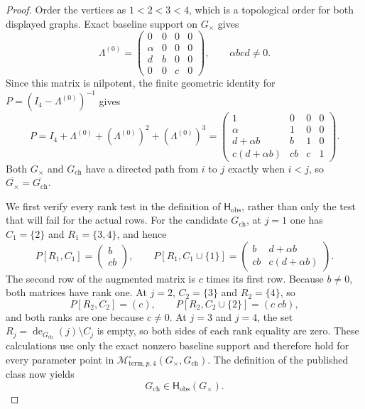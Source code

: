 \documentclass{article}
\begin{document}
\begin{proof}
Order the vertices as \(1<2<3<4\), which is a topological order for both displayed graphs.  Exact baseline support on \(G_{\times}\) gives
\[
\Lambda^{(0)}=
\begin{pmatrix}
0&0&0&0\\
\alpha&0&0&0\\
d&b&0&0\\
0&0&c&0
\end{pmatrix},
\qquad \alpha b c d\ne0.
\]
Since this matrix is nilpotent, the finite geometric identity for \(P=(I_4-\Lambda^{(0)})^{-1}\) gives
\[
P=I_4+\Lambda^{(0)}+(\Lambda^{(0)})^2+(\Lambda^{(0)})^3
=
\begin{pmatrix}
1&0&0&0\\
\alpha&1&0&0\\
d+\alpha b&b&1&0\\
c(d+\alpha b)&cb&c&1
\end{pmatrix}.
\]
Both \(G_{\times}\) and \(G_{\mathrm{ch}}\) have a directed path from \(i\) to \(j\) exactly when \(i<j\), so \(\overline{G_{\times}}=\overline{G_{\mathrm{ch}}}\).

We first verify every rank test in the definition of \(\mathsf H_{\mathrm{obs}}\), rather than only the test that will fail for the actual rows.  For the candidate \(G_{\mathrm{ch}}\), at \(j=1\) one has \(C_1=\{2\}\) and \(R_1=\{3,4\}\), and hence
\[
P[R_1,C_1]=\begin{pmatrix}b\\cb\end{pmatrix},
\qquad
P[R_1,C_1\cup\{1\}]
=\begin{pmatrix}
b&d+\alpha b\\
cb&c(d+\alpha b)
\end{pmatrix}.
\]
The second row of the augmented matrix is \(c\) times its first row.  Because \(b\ne0\), both matrices have rank one.  At \(j=2\), \(C_2=\{3\}\) and \(R_2=\{4\}\), so
\[
P[R_2,C_2]=(c),
\qquad
P[R_2,C_2\cup\{2\}]=(c\;cb),
\]
and both ranks are one because \(c\ne0\).  At \(j=3\) and \(j=4\), the set \(R_j=\operatorname{de}_{G_{\mathrm{ch}}}(j)\setminus C_j\) is empty, so both sides of each rank equality are zero.  These calculations use only the exact nonzero baseline support and therefore hold for every parameter point in \(\mathcal M^{\circ}_{\mathrm{term},p,4}(G_{\times},G_{\mathrm{ch}})\).  The definition of the published class now yields
\[
G_{\mathrm{ch}}\in\mathsf H_{\mathrm{obs}}(G_{\times}).
\]


\end{proof}
\end{document}
